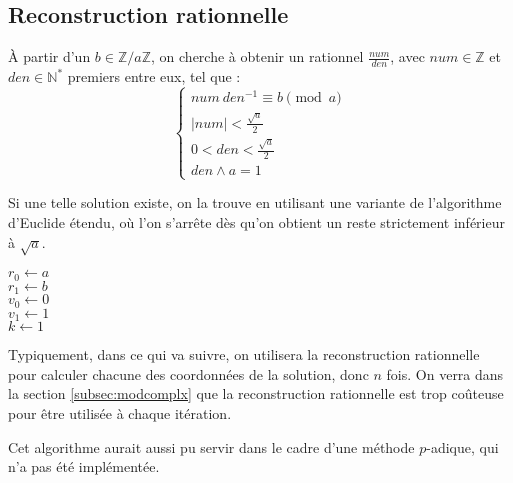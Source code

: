 \documentclass[french]{article}
\begin{document}
\subsection{Reconstruction rationnelle} \label{subsec:recrat}
À partir d'un $b \in \mathbb{Z}/a\mathbb{Z}$, on cherche à obtenir un rationnel $\frac{num}{den}$, avec $num \in \mathbb{Z}$ et $den \in \mathbb{N}^*$ premiers entre eux, tel que :
\begin{equation*}
	\begin{cases}
		num \  den^{-1} \equiv b \pmod a\\
		\lvert num \rvert < \frac{\sqrt{a}}{2}\\
		0 < den < \frac{\sqrt{a}}{2}\\
		den \wedge a = 1
	\end{cases}
\end{equation*}
\par
Si une telle solution existe, on la trouve en utilisant une variante de l'algorithme d'Euclide étendu, où l'on s'arrête dès qu'on obtient un reste strictement inférieur à $\sqrt{a}$.
\newline\newline
\begin{algorithm}[H]
	\DontPrintSemicolon
	$r_0 \gets a$\\
	$r_1 \gets b$\\
	$v_0 \gets 0$\\
	$v_1 \gets 1$\\
	$k \gets 1$\\
\end{algorithm}
\leavevmode
\par
Typiquement, dans ce qui va suivre, on utilisera la reconstruction rationnelle pour calculer chacune des coordonnées de la solution, donc $n$ fois.
On verra dans la section \ref{subsec:modcomplx} que la reconstruction rationnelle est trop coûteuse pour être utilisée à chaque itération.
\par Cet algorithme aurait aussi pu servir dans le cadre d'une méthode $p$-adique, qui n'a pas été implémentée.
\end{document}
